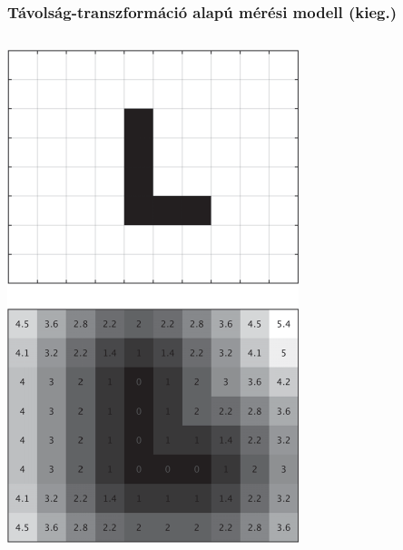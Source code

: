 \documentclass{beamer}
\begin{document}
\begin{frame}
    \frametitle{Távolság-transzformáció alapú mérési modell (kieg.)}
    \begin{columns}[t]
        \begin{column}[]{0.3\textwidth}
            \begin{center}
                \vspace{-1cm}
                \includegraphics[width=1.2\linewidth]{_Figures/simple_dt_vertical.pdf}
            \end{center}
        \end{column}

\end{columns}
\end{frame}
\end{document}
